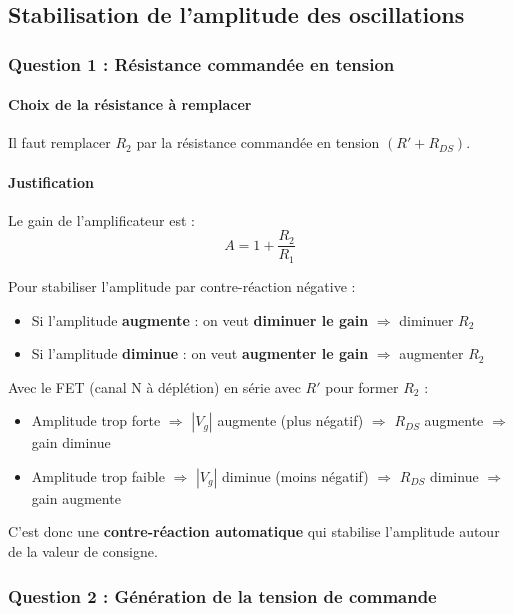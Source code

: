 \documentclass[11pt,a4paper]{article}
\begin{document}
\subsection{Stabilisation de l'amplitude des oscillations}

\subsubsection{Question 1 : Résistance commandée en tension}

\paragraph{Choix de la résistance à remplacer}

Il faut remplacer \textbf{$R_2$} par la résistance commandée en tension $(R' + R_{DS})$.

\paragraph{Justification}

Le gain de l'amplificateur est :
\begin{equation}
A = 1 + \frac{R_2}{R_1}
\end{equation}

Pour stabiliser l'amplitude par contre-réaction négative :
\begin{itemize}
    \item Si l'amplitude \textbf{augmente} : on veut \textbf{diminuer le gain} $\Rightarrow$ diminuer $R_2$
    \item Si l'amplitude \textbf{diminue} : on veut \textbf{augmenter le gain} $\Rightarrow$ augmenter $R_2$
\end{itemize}

Avec le FET (canal N à déplétion) en série avec $R'$ pour former $R_2$ :
\begin{itemize}
    \item Amplitude trop forte $\Rightarrow$ $|V_g|$ augmente (plus négatif) $\Rightarrow$ $R_{DS}$ augmente $\Rightarrow$ gain diminue
    \item Amplitude trop faible $\Rightarrow$ $|V_g|$ diminue (moins négatif) $\Rightarrow$ $R_{DS}$ diminue $\Rightarrow$ gain augmente
\end{itemize}

C'est donc une \textbf{contre-réaction automatique} qui stabilise l'amplitude autour de la valeur de consigne.

\subsubsection{Question 2 : Génération de la tension de commande}
\end{document}
